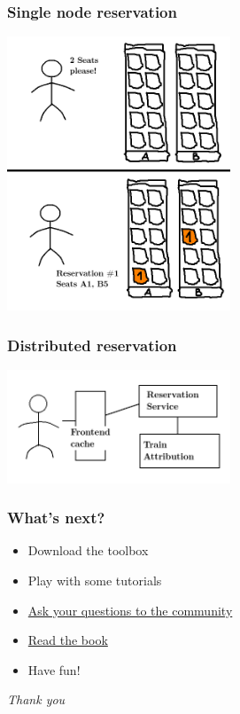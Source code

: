 \documentclass{beamer}
\begin{document}
\begin{frame}
  \frametitle{Single node reservation}
  
  \begin{center}
    \includegraphics[width=0.5\textwidth]{tla-introduction/client-reserving}
  \end{center}
\end{frame}

\begin{frame}
  \frametitle{Distributed reservation}
  
  \begin{center}
    \includegraphics[width=0.5\textwidth]{tla-introduction/complex-system}
  \end{center}
\end{frame}

\begin{frame}
  \frametitle{What's next?}

  \begin{itemize}
  	\item Download the toolbox
  	\item Play with some tutorials
  	\item \href{https://groups.google.com/g/tlaplus}{Ask your questions to the community}
  	\item \href{https://www.informit.com/store/specifying-systems-the-tla-plus-language-and-tools-9780321143068}{Read the book}
  	\item Have fun!
  \end{itemize}
\end{frame}

\begin{frame}
  \centering \Huge \emph{Thank you}
\end{frame}
\end{document}
